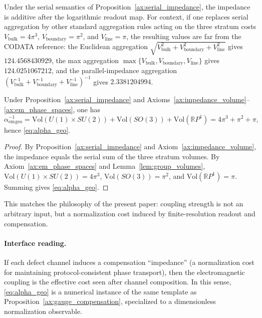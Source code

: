 \begin{remark}\label{rem:alpha_aggregation_isolation}
Under the serial semantics of Proposition~\ref{ax:serial_impedance}, the impedance is additive after the logarithmic readout map.
For context, if one replaces serial aggregation by other standard aggregation rules acting on the three stratum costs $V_{\mathrm{bulk}}=4\pi^3$, $V_{\mathrm{boundary}}=\pi^2$, and $V_{\mathrm{line}}=\pi$, the resulting values are far from the CODATA reference:
the Euclidean aggregation $\sqrt{V_{\mathrm{bulk}}^2+V_{\mathrm{boundary}}^2+V_{\mathrm{line}}^2}$ gives $124.4568430929$,
the max aggregation $\max\{V_{\mathrm{bulk}},V_{\mathrm{boundary}},V_{\mathrm{line}}\}$ gives $124.0251067212$,
and the parallel-impedance aggregation $(V_{\mathrm{bulk}}^{-1}+V_{\mathrm{boundary}}^{-1}+V_{\mathrm{line}}^{-1})^{-1}$ gives $2.3381204994$.
\end{remark}
\begin{theorem}\label{thm:alpha_three_channel}
Under Proposition~\ref{ax:serial_impedance} and Axioms~\ref{ax:impedance_volume}--\ref{ax:em_phase_spaces}, one has
\[
\alpha_{\mathrm{em}}^{-1}{}_{\mathrm{geo}}
=\mathrm{Vol}(U(1)\times SU(2))+\mathrm{Vol}(SO(3))+\mathrm{Vol}(\mathbb{R}P^1)
=4\pi^3+\pi^2+\pi,
\]
hence \eqref{eq:alpha_geo}.
\end{theorem}
\begin{proof}
By Proposition~\ref{ax:serial_impedance} and Axiom~\ref{ax:impedance_volume}, the impedance equals the serial sum of the three stratum volumes.
By Axiom~\ref{ax:em_phase_spaces} and Lemma~\ref{lem:group_volumes}, $\mathrm{Vol}(U(1)\times SU(2))=4\pi^3$, $\mathrm{Vol}(SO(3))=\pi^2$, and $\mathrm{Vol}(\mathbb{R}P^1)=\pi$.
Summing gives \eqref{eq:alpha_geo}.
\end{proof}
This matches the philosophy of the present paper: coupling strength is not an arbitrary input, but a normalization cost induced by finite-resolution readout and compensation.
\paragraph{Interface reading.}
If each defect channel induces a compensation ``impedance'' (a normalization cost for maintaining protocol-consistent phase transport), then the electromagnetic coupling is the effective cost seen after channel composition.
In this sense, \eqref{eq:alpha_geo} is a numerical instance of the same template as Proposition~\ref{ax:gauge_compensation}, specialized to a dimensionless normalization observable.

